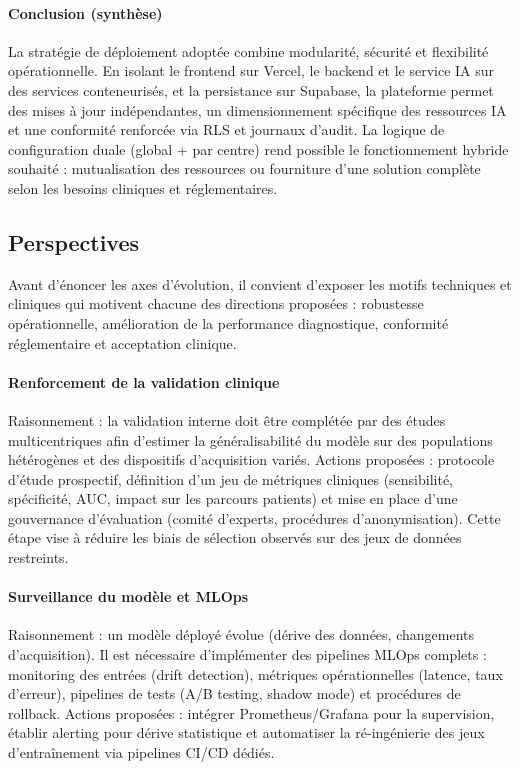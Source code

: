 \paragraph{Conclusion (synthèse)}
La stratégie de déploiement adoptée combine modularité, sécurité et flexibilité opérationnelle. En isolant le frontend sur Vercel, le backend et le service IA sur des services conteneurisés, et la persistance sur Supabase, la plateforme permet des mises à jour indépendantes, un dimensionnement spécifique des ressources IA et une conformité renforcée via RLS et journaux d'audit. La logique de configuration duale (global + par centre) rend possible le fonctionnement hybride souhaité : mutualisation des ressources ou fourniture d'une solution complète selon les besoins cliniques et réglementaires.

\subsection{Perspectives}

Avant d'énoncer les axes d'évolution, il convient d'exposer les motifs techniques et cliniques qui motivent chacune des directions proposées : robustesse opérationnelle, amélioration de la performance diagnostique, conformité réglementaire et acceptation clinique.

\paragraph{Renforcement de la validation clinique}  
Raisonnement : la validation interne doit être complétée par des études multicentriques afin d'estimer la généralisabilité du modèle sur des populations hétérogènes et des dispositifs d'acquisition variés. Actions proposées : protocole d'étude prospectif, définition d'un jeu de métriques cliniques (sensibilité, spécificité, AUC, impact sur les parcours patients) et mise en place d'une gouvernance d'évaluation (comité d'experts, procédures d'anonymisation). Cette étape vise à réduire les biais de sélection observés sur des jeux de données restreints.

\paragraph{Surveillance du modèle et MLOps}  
Raisonnement : un modèle déployé évolue (dérive des données, changements d'acquisition). Il est nécessaire d'implémenter des pipelines MLOps complets : monitoring des entrées (drift detection), métriques opérationnelles (latence, taux d'erreur), pipelines de tests (A/B testing, shadow mode) et procédures de rollback. Actions proposées : intégrer Prometheus/Grafana pour la supervision, établir alerting pour dérive statistique et automatiser la ré-ingénierie des jeux d'entraînement via pipelines CI/CD dédiés.


